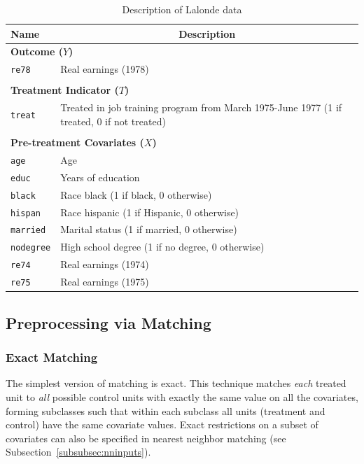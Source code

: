 \documentclass[oneside,letterpaper,titlepage]{article}
\begin{document}
\begin{table}[h]
\centering
\begin{tabular}{lp{3in}}
  \hline 
  \multicolumn{1}{l}{Name} & \multicolumn{1}{c}{Description} \\
  \hline
  \multicolumn{2}{l}{\textbf{Outcome ($Y$)}} \\ 
  \texttt{re78} & Real earnings (1978) \\\\
  \multicolumn{2}{l}{\textbf{Treatment Indicator ($T$)}} \\
  \texttt{treat} & Treated in job training program from March 1975-June
  1977 (1 if treated, 0 if not treated)
  \\ \\
  \multicolumn{2}{l}{\textbf{Pre-treatment Covariates ($X$)}} \\
  \texttt{age} & Age\\
  \texttt{educ} & Years of education \\
  \texttt{black} & Race black (1 if black, 0 otherwise) \\
  \texttt{hispan} & Race hispanic  (1 if Hispanic, 0 otherwise) \\
  \texttt{married} & Marital status (1 if married, 0 otherwise) \\
  \texttt{nodegree} & High school degree (1 if no degree, 0 otherwise)\\
  \texttt{re74} & Real earnings (1974) \\
  \texttt{re75} & Real earnings (1975) \\ 
  \hline
\end{tabular}\label{lalonde}
\caption{Description of Lalonde data \label{dwvars}}
\end{table}

\subsection{Preprocessing via Matching}
\label{subsec:matching}


\subsubsection{Exact Matching}
\label{subsubsec:exact}

The simplest version of matching is exact.  This technique matches
\emph{each} treated unit to \emph{all} possible control units with
exactly the same value on all the covariates, forming subclasses such
that within each subclass all units (treatment and control) have the
same covariate values.  Exact restrictions on a subset of covariates
can also be specified in nearest neighbor matching (see
Subsection~\ref{subsubsec:nninputs}).
\end{document}
